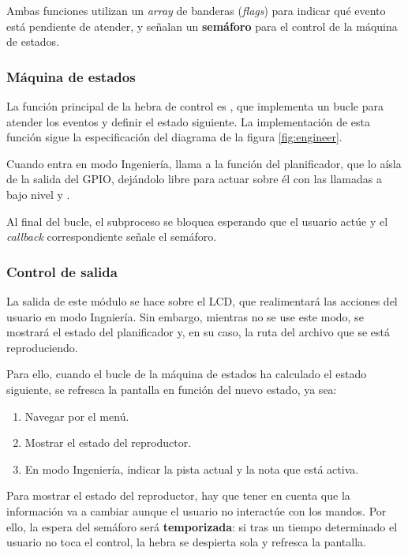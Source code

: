 Ambas funciones utilizan un \textit{array} de banderas (\textit{flags}) para indicar qué evento está pendiente de atender, y señalan un \textbf{semáforo} para el control de la máquina de estados.

\subsubsection{Máquina de estados}

La función principal de la hebra de control es , que implementa un bucle para atender los eventos y definir el estado siguiente. La implementación de esta función sigue la especificación del diagrama de la figura \ref{fig:engineer}.

Cuando entra en modo Ingeniería, llama a la función  del planificador, que lo aísla de la salida del \acrshort{GPIO}, dejándolo libre para actuar sobre él con las llamadas a bajo nivel  y .

Al final del bucle, el subproceso se bloquea esperando que el usuario actúe y el \textit{callback} correspondiente señale el semáforo.

\subsubsection{Control de salida}

La salida de este módulo se hace sobre el \acrshort{LCD}, que realimentará las acciones del usuario en modo Ingniería. Sin embargo, mientras no se use este modo, se mostrará el estado del planificador y, en su caso, la ruta del archivo que se está reproduciendo.

Para ello, cuando el bucle de la máquina de estados ha calculado el estado siguiente, se refresca la pantalla en función del nuevo estado, ya sea:

\begin{enumerate}
	\item Navegar por el menú.
	\item Mostrar el estado del reproductor.
	\item En modo Ingeniería, indicar la pista actual y la nota que está activa.
\end{enumerate}

Para mostrar el estado del reproductor, hay que tener en cuenta que la información va a cambiar aunque el usuario no interactúe con los mandos. Por ello, la espera del semáforo será \textbf{temporizada}: si tras un tiempo determinado el usuario no toca el control, la hebra se despierta sola y refresca la pantalla.

